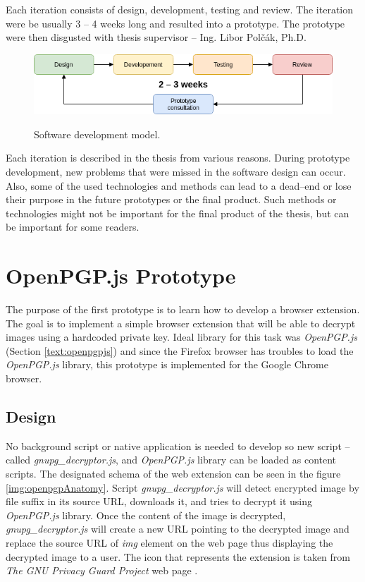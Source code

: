 Each iteration consists of design, development, testing and review. The iteration were be usually 3 -- 4 weeks long and resulted into a prototype. The prototype were then disgusted with thesis supervisor -- Ing. Libor Polčák, Ph.D.

\begin{figure}[H]
    \begin{center}
        \label{img:extensionAnatomy}
        \includegraphics[width=1.0\textwidth]{obrazky-figures/developementModel.png}
        \caption{Software development model.}
    \end{center}
\end{figure}

Each iteration is described in the thesis from various reasons. During prototype development, new problems that were missed in the software design can occur. Also, some of the used technologies and methods can lead to a dead--end or lose their purpose in the future prototypes or the final product. Such methods or technologies might not be important for the final product of the thesis, but can be important for some readers.

\section{OpenPGP.js Prototype}
\label{prototype:OpenPGPjs}
The purpose of the first prototype is to learn how to develop a browser extension. The goal is to implement a simple browser extension that will be able to decrypt images using a hardcoded private key. Ideal library for this task was \textit{OpenPGP.js} (Section \ref{text:openpgpjs}) and since the Firefox browser has troubles to load the \textit{OpenPGP.js} library, this prototype is implemented for the Google Chrome browser.

\subsection{Design}
No background script or native application is needed to develop so new script -- called \textit{gnupg\_decryptor.js}, and \textit{OpenPGP.js} library can be loaded as content scripts. The designated schema of the web extension can be seen in the figure \ref{img:openpgpAnatomy}. Script \textit{gnupg\_decryptor.js} will detect encrypted image by file suffix in its source URL, downloads it, and tries to decrypt it using \textit{OpenPGP.js} library. Once the content of the image is decrypted, \textit{gnupg\_decryptor.js} will create a new URL pointing to the decrypted image and replace the source URL of \textit{img} element on the web page thus displaying the decrypted image to a user. The icon that represents the extension is taken from \textit{The GNU Privacy Guard Project} web page \cite{GnuPG}.

